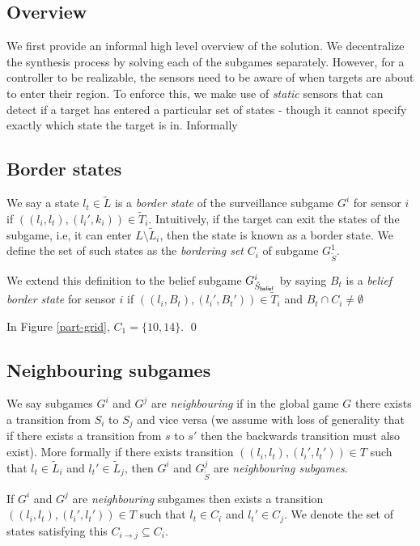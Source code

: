 \subsection{Overview}
We first provide an informal high level overview of the solution. We decentralize the synthesis process by solving each of the subgames separately. However, for a controller to be realizable, the sensors need to be aware of when targets are about to enter their region. To enforce this, we make use of \emph{static} sensors that can detect if a target has entered a particular set of states - though it cannot specify exactly which state the target is in. Informally

\subsection{Border states}
We say a state $l_t \in \widetilde{L}$ is a \emph{border state} of the surveillance subgame $G^i$ for sensor $i$ if $((l_i,l_t),(l_i',k_i)) \in \widetilde{T}_i$. Intuitively, if the target can exit the states of the subgame, i.e, it can enter $L\setminus\widetilde{L}_i$, then the state is known as a border state. We define the set of such states as the \emph{bordering set} $C_i$ of subgame $G^1_{\tilde{S}}$. 

We extend this definition to the belief subgame $G^i_{\tilde{S}_{\mathsf{belief}}}$ by saying $B_t$ is a \emph{belief border state} for sensor $i$ if $((l_i,B_t),(l_i',B_t')) \in \widetilde{T}_i$ and $B_t \cap C_i \neq \emptyset$ 

\begin{example}
In Figure \ref{part-grid}, $C_1 = \{10,14\}$. \qed
\end{example}

\subsection{Neighbouring subgames}
We say subgames $G^i$ and $G^j$ are \emph{neighbouring} if in the global game $G$ there exists a transition from $S_i$ to $S_j$ and vice versa (we assume with loss of generality that if there exists a transition from $s$ to $s'$ then the backwards transition must also exist). More formally if there exists transition $((l_i,l_t),(l_i',l_t')) \in T$ such that $l_t \in \widetilde{L}_i$ and $l_t' \in \widetilde{L}_j$, then $G^i$ and $G^j_{\tilde{S}}$ are \emph{neighbouring subgames}.

\begin{proposition}
If $G^i$ and $G^j$ are \emph{neighbouring} subgames then exists a transition $((l_i,l_t),(l_i',l_t')) \in T$ such that $l_t \in C_i$ and $l_t' \in C_j$. We denote the set of states satisfying this $C_{i \rightarrow j} \subseteq C_i$.
\end{proposition}

